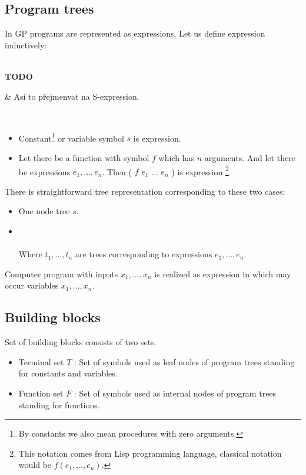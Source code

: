 \documentclass[12pt,a4paper]{report}
\newcommand{\Lets}{Let us\xspace}
\newenvironment{todo}
{ ~\\[0.5em]
  \textbf{TODO}
  \begin{easylist}[itemize]}
{ \end{easylist}
  ~}
\begin{document}
\subsection{Program trees}

In GP programs are represented as expressions. \Lets define expression inductively:

\begin{todo}
 & Asi to přejmenvat na S-expression.  
\end{todo}

\begin{itemize}
	\item Constant\footnote{By constants we also mean procedures with zero  	
		  arguments.} or variable symbol $s$ is expression.
	\item Let there be a function with symbol $f$ which has $n$ arguments. 
	      And let there be expressions $e_{1}, ..., e_{n}$. 
	      Then ( $f$ $e_{1}$ ... $e_{n}$ ) is expression
	      \footnote{This notation comes from Lisp programming language, 
	      classical notation would be $f(e_{1}, ... ,e_{n})$. }.   
\end{itemize}

There is straightforward tree representation corresponding to these two cases:

\begin{itemize}
	\item One node tree $s$.
    \item {}\\\\
		 Where $t_{1}, ..., t_{n}$ are trees corresponding to expressions $e_{1}, ..., e_{n}$.	   
\end{itemize}

Computer program with inputs $x_{1}, ..., x_{n}$ is realized as expression in which 
may occur variables $x_{1}, ..., x_{n}$.

\subsection{Building blocks}
\label{building-blocks}

Set of building blocks consists of two sets.

\begin{itemize}
	\item Terminal set $T$ : Set of symbols used as leaf nodes of 	               
	      program trees standing for constants and variables.
	\item Function set $F$ : Set of symbols used as internal nodes 
	      of program trees standing for functions.
\end{itemize}
\end{document}

